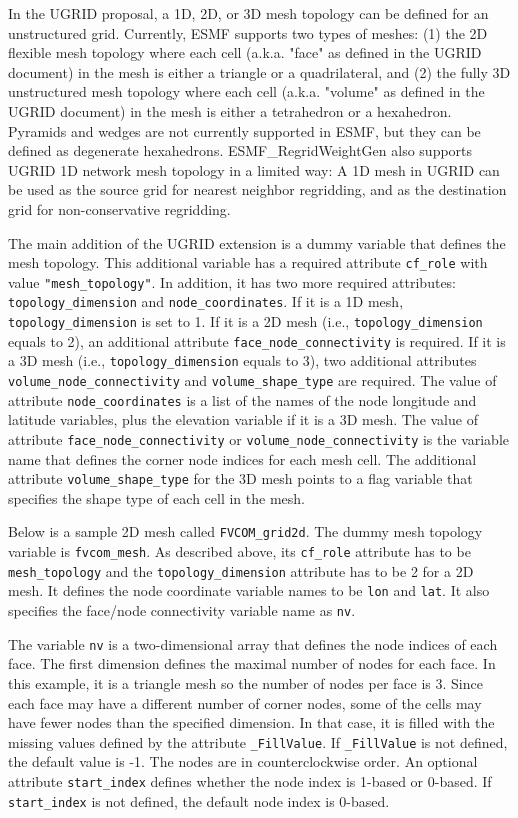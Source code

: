 In the UGRID proposal, a 1D, 2D, or 3D mesh topology can be defined for an unstructured grid.  Currently, ESMF
supports two types of meshes: (1) the 2D flexible mesh topology where each cell (a.k.a. "face" as defined in the UGRID document) in the mesh is either a triangle or a quadrilateral, and (2) the fully 3D unstructured mesh topology where each cell (a.k.a. "volume" as defined in the UGRID document) in the mesh
is either a tetrahedron or a hexahedron.  Pyramids and wedges are not currently supported in ESMF, but they
can be defined as degenerate hexahedrons.   ESMF\_RegridWeightGen also
supports UGRID 1D network mesh topology in a limited way:  A 1D mesh in UGRID
can be used as the source grid for nearest neighbor regridding, and as the
destination grid for non-conservative regridding.  

The main addition of the UGRID extension is a dummy variable that defines the mesh
topology.  This additional variable has a required attribute {\tt cf\_role}
with value {\tt "mesh\_topology"}.  In addition, it has two more required attributes: {\tt topology\_dimension}
and {\tt node\_coordinates}.  If it is a 1D mesh, {\tt topology\_dimension} is
set to 1.  
If it is a 2D mesh (i.e., {\tt topology\_dimension} equals to 2), an additional attribute
{\tt face\_node\_connectivity} is required.  If it is a 3D mesh (i.e., {\tt topology\_dimension} equals to 3), two additional attributes {\tt volume\_node\_connectivity} and {\tt volume\_shape\_type} are required.
The value of attribute {\tt node\_coordinates} is a list of the names of the node longitude and latitude variables,
plus the elevation variable if it is a 3D mesh.
The value of attribute {\tt face\_node\_connectivity} or {\tt volume\_node\_connectivity} is the variable name that defines the corner node indices for each mesh cell. The additional attribute {\tt volume\_shape\_type} for the
3D mesh points to a flag variable that specifies the shape type of each cell in the mesh.

Below is a sample 2D mesh called {\tt FVCOM\_grid2d}. The dummy mesh topology variable is {\tt fvcom\_mesh}.  As described above, its {\tt cf\_role} attribute has to be {\tt mesh\_topology}
and the {\tt topology\_dimension} attribute has to be 2 for a 2D mesh.  It defines
the node coordinate variable names to be {\tt lon} and {\tt lat}.  It also specifies the face/node connectivity variable name as {\tt nv}.

The variable {\tt nv} is a two-dimensional array that defines the node indices of each face. The first dimension
defines the maximal number of nodes for each face. In this example, it is a
triangle mesh so the number of nodes per face is 3.  Since each face may have a different number of corner nodes,
some of the cells may have fewer nodes than the specified dimension. In that case, it is filled with the
missing values defined by the attribute {\tt \_FillValue}.  If {\tt \_FillValue} is not defined, the default value
is -1. The nodes are in counterclockwise order.  An optional attribute
{\tt start\_index} defines whether the node index is 1-based or 0-based.  If {\tt start\_index} is not defined, 
the default node index is 0-based.

